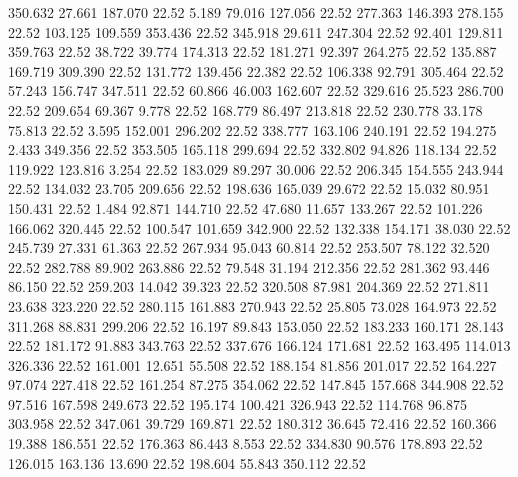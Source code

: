  350.632   27.661  187.070        22.52
   5.189   79.016  127.056        22.52
 277.363  146.393  278.155        22.52
 103.125  109.559  353.436        22.52
 345.918   29.611  247.304        22.52
  92.401  129.811  359.763        22.52
  38.722   39.774  174.313        22.52
 181.271   92.397  264.275        22.52
 135.887  169.719  309.390        22.52
 131.772  139.456   22.382        22.52
 106.338   92.791  305.464        22.52
  57.243  156.747  347.511        22.52
  60.866   46.003  162.607        22.52
 329.616   25.523  286.700        22.52
 209.654   69.367    9.778        22.52
 168.779   86.497  213.818        22.52
 230.778   33.178   75.813        22.52
   3.595  152.001  296.202        22.52
 338.777  163.106  240.191        22.52
 194.275    2.433  349.356        22.52
 353.505  165.118  299.694        22.52
 332.802   94.826  118.134        22.52
 119.922  123.816    3.254        22.52
 183.029   89.297   30.006        22.52
 206.345  154.555  243.944        22.52
 134.032   23.705  209.656        22.52
 198.636  165.039   29.672        22.52
  15.032   80.951  150.431        22.52
   1.484   92.871  144.710        22.52
  47.680   11.657  133.267        22.52
 101.226  166.062  320.445        22.52
 100.547  101.659  342.900        22.52
 132.338  154.171   38.030        22.52
 245.739   27.331   61.363        22.52
 267.934   95.043   60.814        22.52
 253.507   78.122   32.520        22.52
 282.788   89.902  263.886        22.52
  79.548   31.194  212.356        22.52
 281.362   93.446   86.150        22.52
 259.203   14.042   39.323        22.52
 320.508   87.981  204.369        22.52
 271.811   23.638  323.220        22.52
 280.115  161.883  270.943        22.52
  25.805   73.028  164.973        22.52
 311.268   88.831  299.206        22.52
  16.197   89.843  153.050        22.52
 183.233  160.171   28.143        22.52
 181.172   91.883  343.763        22.52
 337.676  166.124  171.681        22.52
 163.495  114.013  326.336        22.52
 161.001   12.651   55.508        22.52
 188.154   81.856  201.017        22.52
 164.227   97.074  227.418        22.52
 161.254   87.275  354.062        22.52
 147.845  157.668  344.908        22.52
  97.516  167.598  249.673        22.52
 195.174  100.421  326.943        22.52
 114.768   96.875  303.958        22.52
 347.061   39.729  169.871        22.52
 180.312   36.645   72.416        22.52
 160.366   19.388  186.551        22.52
 176.363   86.443    8.553        22.52
 334.830   90.576  178.893        22.52
 126.015  163.136   13.690        22.52
 198.604   55.843  350.112        22.52
